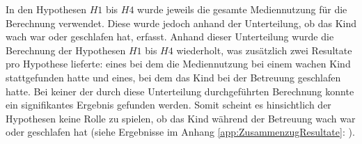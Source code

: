 In den Hypothesen $H1$ bis $H4$ wurde jeweils die gesamte Mediennutzung für die Berechnung verwendet. Diese wurde jedoch anhand der Unterteilung, ob das Kind wach war oder geschlafen hat, erfasst. Anhand dieser Unterteilung wurde die Berechnung der Hypothesen $H1$ bis $H4$ wiederholt, was zusätzlich zwei Resultate pro Hypothese lieferte: eines bei dem die Mediennutzung bei einem wachen Kind stattgefunden hatte und eines, bei dem das Kind bei der Betreuung geschlafen hatte. Bei keiner der durch diese Unterteilung durchgeführten Berechnung konnte ein signifikantes Ergebnis gefunden werden. Somit scheint es hinsichtlich der Hypothesen keine Rolle zu spielen, ob das Kind während der Betreuung wach war oder geschlafen hat (siehe Ergebnisse im Anhang \ref{app:ZusammenzugResultate}: \textit{}).

